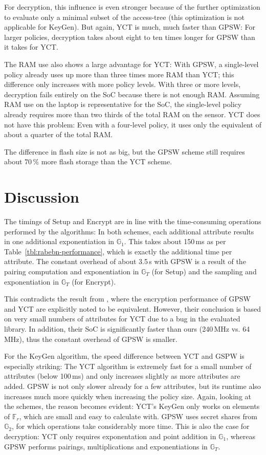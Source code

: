 For decryption, this influence is even stronger because of the further optimization to evaluate only a minimal subset of the \gls{access-tree} (this optimization is not applicable for KeyGen).
But again, YCT is much, much faster than GPSW: For larger policies, decryption takes about eight to ten times longer for GPSW than it takes for YCT.

The RAM use also shows a large advantage for YCT:
With GPSW, a single-level policy already uses up more than three times more RAM than YCT; this difference only increases with more policy levels.
With three or more levels, decryption fails entirely on the SoC because there is not enough RAM.
Assuming RAM use on the laptop is representative for the SoC, the single-level policy already requires more than two thirds of the total RAM on the sensor.
YCT does not have this problem: Even with a four-level policy, it uses only the equivalent of about a quarter of the total RAM.

The difference in flash size is not as big, but the GPSW scheme still requires about 70\,\% more flash storage than the YCT scheme.


\section{Discussion}
The timings of Setup and Encrypt are in line with the time-consuming operations performed by the algorithms: 
In both schemes, each additional attribute results in one additional exponentiation in $\mathbb{G}_1$.
This takes about 150\,ms as per Table~\ref{tbl:rabebn-performance}, which is exactly the additional time per attribute.
The constant overhead of about 3.5\,s with GPSW is a result of the pairing computation and exponentiation in $\mathbb{G}_T$ (for Setup) and the sampling and exponentiation in $\mathbb{G}_T$ (for Encrypt).

This contradicts the result from \cite{girgenti_feasibility_2019}, where the encryption performance of GPSW and YCT are explicitly noted to be equivalent.
However, their conclusion is based on very small numbers of attributes for YCT due to a bug in the evaluated library.
In addition, their SoC is significantly faster than ours (240\,MHz vs. 64\,MHz), thus the constant overhead of GPSW is smaller.

For the KeyGen algorithm, the speed difference between YCT and GSPW is especially striking: 
The YCT algorithm is extremely fast for a small number of attributes (below 100\,ms) and only increases slightly as more attributes are added.
GPSW is not only slower already for a few attributes, but its runtime also increases much more quickly when increasing the policy size.
Again, looking at the schemes, the reason becomes evident: YCT's KeyGen only works on elements of $\mathbb{F}_r$, which are small and easy to calculate with.
GPSW uses secret shares from $\mathbb{G}_2$, for which operations take considerably more time.
This is also the case for decryption: YCT only requires exponentation and point addition in $\mathbb{G}_1$, whereas GPSW performs pairings, multiplications and exponentiations in $\mathbb{G}_T$.

